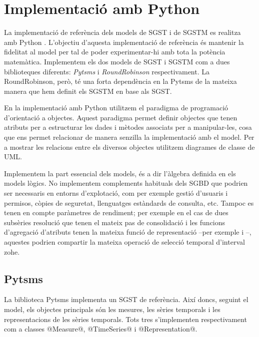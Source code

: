 

\chapter{Implementació amb Python}



La implementació de referència dels models de \gls{SGST} i de \gls{SGSTM}
es realitza amb Python \parencite{python:doc2}. L'objectiu d'aquesta
implementació de referència és mantenir la fidelitat al model per tal
de poder experimentar-hi amb tota la potència matemàtica.
Implementem els dos models de \gls{SGST} i \gls{SGSTM} com a dues biblioteques
diferents: \emph{Pytsms} i \emph{RoundRobinson} respectivament. La
RoundRobinson, però, té una forta dependència en la
Pytsms de la mateixa manera que hem definit els \gls{SGSTM} en base
als \gls{SGST}.


En la implementació amb Python utilitzem el paradigma de programació
d'orientació a objectes. Aquest paradigma permet definir objectes que
tenen atributs per a estructurar les dades i mètodes associats per a
manipular-les, cosa que ens permet relacionar de manera senzilla la
implementació amb el model.  Per a mostrar les relacions entre els
diversos objectes utilitzem diagrames de classe de \gls{UML}.




Implementem la part essencial dels models, és a dir l'àlgebra definida
en els models lògics. No implementem complements habituals dels
\gls{SGBD} que podrien ser necessaris en entorns d'explotació, com per
exemple gestió d'usuaris i permisos, còpies de seguretat, llenguatges
estàndards de consulta, etc.  Tampoc es tenen en compte paràmetres de
rendiment; per exemple en el cas de dues subsèries resolució que tenen
el mateix pas de consolidació i les funcions d'agregació d'atributs
tenen la mateixa funció de representació --per exemple
 i --,
aquestes podrien compartir la mateixa operació de
selecció temporal d'interval \gls{zohe}.



\section{Pytsms}

La biblioteca Pytsms implementa un \gls{SGST} de referència. Així
doncs, seguint el model, els objectes principals són les mesures, les
sèries temporals i les representacions de les sèries temporals. Tots
tres s'implementen respectivament com a classes @Measure@,
@TimeSeries@ i @Representation@.


